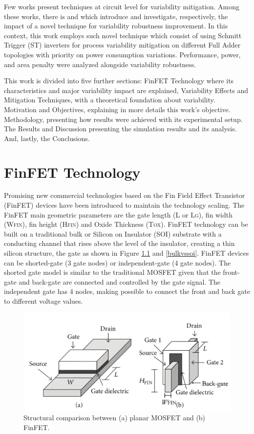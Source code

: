 \documentclass[ecp,tc, english]{iiufrgs}
\begin{document}
Few works present techniques at circuit level for variability mitigation. Among these works, there is \cite{dokania2015circuit} and \cite{samuel2016} which introduce and investigate, respectively, the impact of a novel technique for variability robustness improvement. In this context, this work employs such novel technique which consist of using Schmitt Trigger (ST) inverters for process variability mitigation on different Full Adder topologies with priority on power consumption variations. Performance, power, and area penalty were analyzed alongside variability robustness. 

This work is divided into five further sections: FinFET Technology where its characteristics and major variability impact are explained, Variability Effects and Mitigation Techniques, with a theoretical foundation about variability. Motivation and Objectives, explaining in more details this work’s objective. Methodology, presenting how results were achieved with its experimental setup. The Results and Discussion presenting the simulation results and its analysis. And, lastly, the Conclusions.

\chapter{FinFET Technology}

Promising new commercial technologies based on the Fin Field Effect Transistor (FinFET) devices have been introduced to maintain the technology scaling. The FinFET main geometric parameters are the gate length (L or L\textsc{g}), fin width (W\textsc{fin}), fin height (H\textsc{fin}) and Oxide Thickness (T\textsc{ox}). FinFET technology can be built on a traditional bulk or Silicon on Insulator (SOI) substrate with a conducting channel that rises above the level of the insulator, creating a thin silicon structure, the gate as shown in Figure \ref{mosfetvsfinfet} and \ref{bulkvssoi}. FinFET devices can be shorted-gate (3 gate nodes) or independent-gate (4 gate nodes). The shorted gate model is similar to the traditional MOSFET given that the front-gate and back-gate are connected and controlled by the gate signal. The independent gate has 4 nodes, making possible to connect the front and back gate to different voltage values.

\begin{figure}[H]
\centering
\includegraphics[width=\textwidth, trim={0 0cm 0 0cm},clip]{finfet.pdf}
\caption{Structural comparison between (a) planar MOSFET and (b) FinFET.}
\label{mosfetvsfinfet}
\end{figure}
\end{document}
